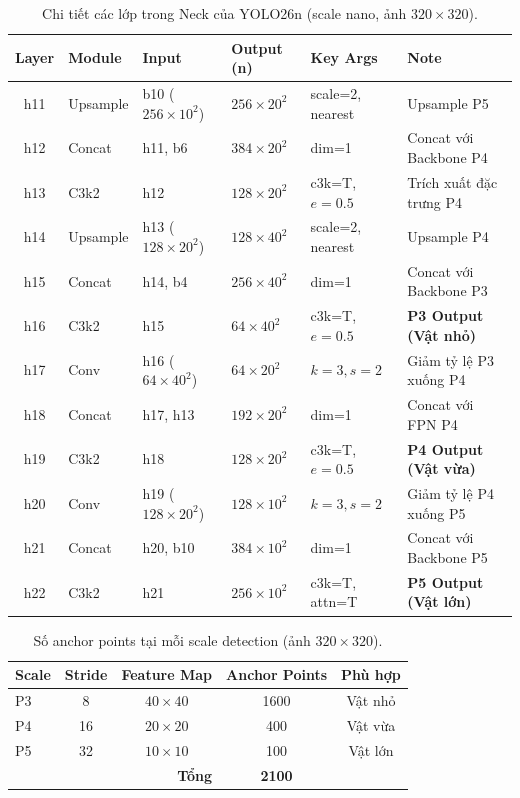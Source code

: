 \begin{table}[H]
\centering
\small
\caption{Chi tiết các lớp trong Neck của YOLO26n (scale nano, ảnh $320\times320$).}
\label{tab:neck_layers}
\begin{tabular}{clllll}
\toprule
\textbf{Layer} & \textbf{Module} & \textbf{Input} & \textbf{Output (n)} & \textbf{Key Args} & \textbf{Note} \\
\midrule
h11 & Upsample & b10 ($256\times10^2$) & $256\times20^2$ & scale=2, nearest & Upsample P5 \\
h12 & Concat   & h11, b6               & $384\times20^2$ & dim=1            & Concat với Backbone P4 \\
h13 & C3k2     & h12                   & $128\times20^2$ & c3k=T, $e\!=\!0.5$ & Trích xuất đặc trưng P4 \\
h14 & Upsample & h13 ($128\times20^2$) & $128\times40^2$ & scale=2, nearest & Upsample P4 \\
h15 & Concat   & h14, b4               & $256\times40^2$ & dim=1            & Concat với Backbone P3 \\
h16 & C3k2     & h15                   & $64\times40^2$  & c3k=T, $e\!=\!0.5$ & \textbf{P3 Output (Vật nhỏ)} \\
h17 & Conv     & h16 ($64\times40^2$)  & $64\times20^2$  & $k\!=\!3, s\!=\!2$ & Giảm tỷ lệ P3 xuống P4 \\
h18 & Concat   & h17, h13              & $192\times20^2$ & dim=1            & Concat với FPN P4 \\
h19 & C3k2     & h18                   & $128\times20^2$ & c3k=T, $e\!=\!0.5$ & \textbf{P4 Output (Vật vừa)} \\
h20 & Conv     & h19 ($128\times20^2$) & $128\times10^2$ & $k\!=\!3, s\!=\!2$ & Giảm tỷ lệ P4 xuống P5 \\
h21 & Concat   & h20, b10              & $384\times10^2$ & dim=1            & Concat với Backbone P5 \\
h22 & C3k2     & h21                   & $256\times10^2$ & c3k=T, attn=T    & \textbf{P5 Output (Vật lớn)} \\
\bottomrule
\end{tabular}
\end{table}

\begin{table}[H]
\centering
\caption{Số anchor points tại mỗi scale detection (ảnh $320\times320$).}
\label{tab:anchors}
\begin{tabular}{lcccc}
\toprule
\textbf{Scale} & \textbf{Stride} & \textbf{Feature Map} & \textbf{Anchor Points} & \textbf{Phù hợp} \\
\midrule
P3 & 8  & $40\times40$  & 1600 & Vật nhỏ \\
P4 & 16 & $20\times20$  & 400  & Vật vừa \\
P5 & 32 & $10\times10$  & 100  & Vật lớn \\
\midrule
\multicolumn{3}{r}{\textbf{Tổng}} & \textbf{2100} & \\
\bottomrule
\end{tabular}
\end{table}

